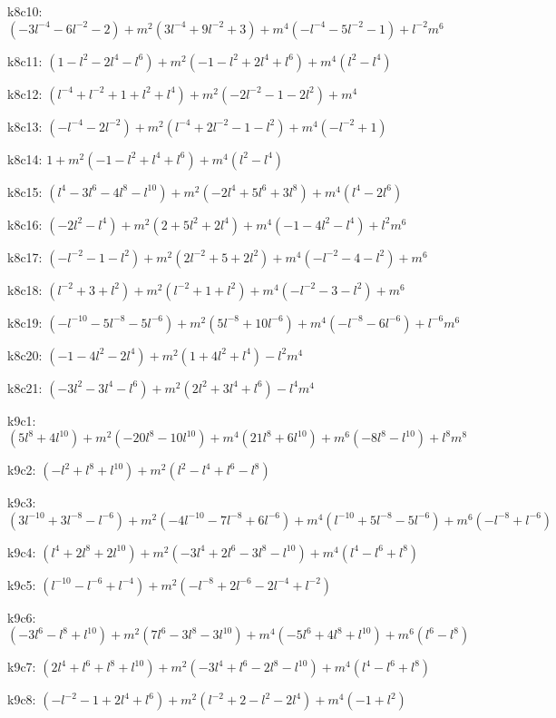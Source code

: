 k8c10: $ (-3l^{-4}-6l^{-2}-2)  +m^{2}(3l^{-4}+9l^{-2}+3)  +m^{4}(-l^{-4}-5l^{-2}-1)  +l^{-2}m^{6} $ 

k8c11: $ (1-l^{2}-2l^{4}-l^{6})  +m^{2}(-1-l^{2}+2l^{4}+l^{6})  +m^{4}(l^{2}-l^{4}) $ 

k8c12: $ (l^{-4}+l^{-2}+1+l^{2}+l^{4})  +m^{2}(-2l^{-2}-1-2l^{2})  +m^{4} $ 

k8c13: $ (-l^{-4}-2l^{-2})  +m^{2}(l^{-4}+2l^{-2}-1-l^{2})  +m^{4}(-l^{-2}+1) $ 

k8c14: $ 1  +m^{2}(-1-l^{2}+l^{4}+l^{6})  +m^{4}(l^{2}-l^{4}) $ 

k8c15: $ (l^{4}-3l^{6}-4l^{8}-l^{10})  +m^{2}(-2l^{4}+5l^{6}+3l^{8})  +m^{4}(l^{4}-2l^{6}) $ 

k8c16: $ (-2l^{2}-l^{4})  +m^{2}(2+5l^{2}+2l^{4})  +m^{4}(-1-4l^{2}-l^{4})  +l^{2}m^{6} $ 

k8c17: $ (-l^{-2}-1-l^{2})  +m^{2}(2l^{-2}+5+2l^{2})  +m^{4}(-l^{-2}-4-l^{2})  +m^{6} $ 

k8c18: $ (l^{-2}+3+l^{2})  +m^{2}(l^{-2}+1+l^{2})  +m^{4}(-l^{-2}-3-l^{2})  +m^{6} $ 

k8c19: $ (-l^{-10}-5l^{-8}-5l^{-6})  +m^{2}(5l^{-8}+10l^{-6})  +m^{4}(-l^{-8}-6l^{-6})  +l^{-6}m^{6} $ 

k8c20: $ (-1-4l^{2}-2l^{4})  +m^{2}(1+4l^{2}+l^{4})  -l^{2}m^{4} $ 

k8c21: $ (-3l^{2}-3l^{4}-l^{6})  +m^{2}(2l^{2}+3l^{4}+l^{6})  -l^{4}m^{4} $ 

k9c1: $ (5l^{8}+4l^{10})  +m^{2}(-20l^{8}-10l^{10})  +m^{4}(21l^{8}+6l^{10})  +m^{6}(-8l^{8}-l^{10})  +l^{8}m^{8} $ 

k9c2: $ (-l^{2}+l^{8}+l^{10})  +m^{2}(l^{2}-l^{4}+l^{6}-l^{8}) $ 

k9c3: $ (3l^{-10}+3l^{-8}-l^{-6})  +m^{2}(-4l^{-10}-7l^{-8}+6l^{-6})  +m^{4}(l^{-10}+5l^{-8}-5l^{-6})  +m^{6}(-l^{-8}+l^{-6}) $ 

k9c4: $ (l^{4}+2l^{8}+2l^{10})  +m^{2}(-3l^{4}+2l^{6}-3l^{8}-l^{10})  +m^{4}(l^{4}-l^{6}+l^{8}) $ 

k9c5: $ (l^{-10}-l^{-6}+l^{-4})  +m^{2}(-l^{-8}+2l^{-6}-2l^{-4}+l^{-2}) $ 

k9c6: $ (-3l^{6}-l^{8}+l^{10})  +m^{2}(7l^{6}-3l^{8}-3l^{10})  +m^{4}(-5l^{6}+4l^{8}+l^{10})  +m^{6}(l^{6}-l^{8}) $ 

k9c7: $ (2l^{4}+l^{6}+l^{8}+l^{10})  +m^{2}(-3l^{4}+l^{6}-2l^{8}-l^{10})  +m^{4}(l^{4}-l^{6}+l^{8}) $ 

k9c8: $ (-l^{-2}-1+2l^{4}+l^{6})  +m^{2}(l^{-2}+2-l^{2}-2l^{4})  +m^{4}(-1+l^{2}) $ 

